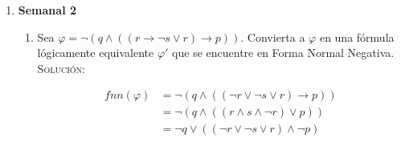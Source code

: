\documentclass[letterpaper,12pt]{article}
\begin{document}
\begin{enumerate}
\begin{enumerate}
\begin{proof}
\begin{itemize}
\begin{enumerate}
\begin{itemize}
                        \item[iii)] $\varphi = \phi \star \psi$ con 
                        $\star \in \{ \leftrightarrow\}$. Entonces 
                        
                        \begin{align*}
                            nn(\varphi) 
                            &= nn(\phi \leftrightarrow \psi)
                            && \text{def. de $\varphi$} \\
                            &= nn(\phi) + nn(\psi) + 0
                            && \text{def. recursiva de nn} \\
                            &\leq nn(qi(\phi)) + nn(qi(\psi)) + 0
                            && \text{H.I.} \\
                            &\leq nn(qi(\phi) \leftrightarrow qi(\psi))
                            && \text{def. recursiva de nn} \\
                            &\leq nn((\neg qi(\phi) \lor qi(\psi)) \land 
                            (qi(\phi) \lor \neg qi(\psi)))
                            && \text{equivalencia lógica} \\
                            &\leq nn(qi(\phi \leftrightarrow \psi))
                            && \text{def. recursiva de qi} \\
                            &\leq nn(qi(\varphi))
                            && \text{def. de $\varphi$}
                        \end{align*}
                    \end{itemize}
                \end{enumerate}
            \end{itemize}
        \end{proof}
    \end{enumerate}

    \newpage
    \item \textbf{Semanal 2}
    
    \begin{enumerate}
        \item Sea 
        $\varphi = \neg(q \land ((r \rightarrow \neg s \lor r) \rightarrow p))$.
        Convierta a $\varphi$ en una fórmula lógicamente equivalente $\varphi '$
        que se encuentre en Forma Normal Negativa. \\
        \textsc{Solución:}
        
        \begin{align*}
            fnn(\varphi) 
            &= \neg(q \land ((\neg r \lor \neg s \lor r) \rightarrow p)) \\
            &= \neg(q \land ((r \land s \land \neg r) \lor p)) \\
            &= \neg q \lor ((\neg r \lor \neg s \lor r) \land \neg p)
        \end{align*}


\end{enumerate}
\end{enumerate}
\end{document}
